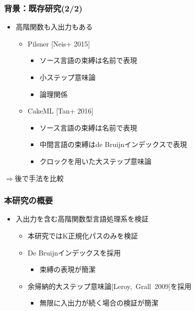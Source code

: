 \documentclass[t,dvipdfmx,cjk,xcolor=dvipsnames,envcountsect,notheorems,12pt]{beamer}
\theoremstyle{definition}
\begin{document}
\begin{frame}
	\frametitle{背景：既存研究(2/2)}
	\begin{itemize}
		\item 高階関数も入出力もある
			\begin{itemize}
				\item Pilsner [Neis+ 2015]
					\begin{itemize}
						\item ソース言語の束縛は名前で表現
						\item 小ステップ意味論
						\item 論理関係
					\end{itemize}
				\item CakeML [Tan+ 2016]
					\begin{itemize}
						\item ソース言語の束縛は名前で表現
						\item 中間言語の束縛はde Bruijnインデックスで表現
						\item クロックを用いた大ステップ意味論
					\end{itemize}
			\end{itemize}
	\end{itemize}
	\begin{flushright}
		\Large $\Rightarrow$後で手法を比較
	\end{flushright}
\end{frame}

\begin{frame}
	\frametitle{本研究の概要}
	\begin{itemize}
		\item 入出力を含む高階関数型言語処理系を検証
			\begin{itemize}
				\item 本研究ではK正規化パスのみを検証
				\item De Bruijnインデックスを採用
					\begin{itemize}
						\item 束縛の表現が簡潔
					\end{itemize}
				\item 余帰納的大ステップ意味論\mbox{[Leroy, Grall 2009]}を採用
					\begin{itemize}
						\item 無限に入出力が続く場合の検証が簡潔
					\end{itemize}
			\end{itemize}
	\end{itemize}
\end{frame}
\end{document}
